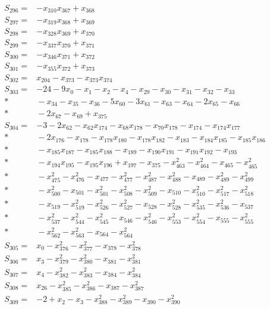 \begin{align*}
S_{296}={}&-x_{310}x_{367}+x_{368}\\[3pt]
S_{297}={}&-x_{319}x_{368}+x_{369}\\[3pt]
S_{298}={}&-x_{328}x_{369}+x_{370}\\[3pt]
S_{299}={}&-x_{337}x_{370}+x_{371}\\[3pt]
S_{300}={}&-x_{346}x_{371}+x_{372}\\[3pt]
S_{301}={}&-x_{355}x_{372}+x_{373}\\[3pt]
S_{302}={}&x_{204}-x_{373}-x_{373}x_{374}\\[3pt]
S_{303}={}&-24-9x_{0}-x_{1}-x_{2}-x_{4}-x_{29}-x_{30}-x_{31}-x_{32}-x_{33}\\*
&{}-x_{34}-x_{35}-x_{36}-5x_{60}-3x_{61}-x_{63}-x_{64}-2x_{65}-x_{66}\\*
&{}-2x_{67}-x_{69}+x_{375}\\[3pt]
S_{304}={}&-3-2x_{62}-x_{62}x_{174}-x_{68}x_{178}-x_{70}x_{178}-x_{174}-x_{174}x_{177}\\*
&{}-2x_{176}-x_{178}-x_{178}x_{180}-x_{178}x_{182}-x_{183}-x_{184}x_{185}-x_{185}x_{186}\\*
&{}-x_{185}x_{187}-x_{185}x_{188}-x_{189}-x_{190}x_{191}-x_{191}x_{192}-x_{193}\\*
&{}-x_{194}x_{195}-x_{195}x_{196}+x_{197}-x_{375}-x_{463}^{2}-x_{464}^{2}-x_{465}-x_{465}^{2}\\*
&{}-x_{475}^{2}-x_{476}^{2}-x_{477}-x_{477}^{2}-x_{487}^{2}-x_{488}^{2}-x_{489}-x_{489}^{2}-x_{499}^{2}\\*
&{}-x_{500}^{2}-x_{501}-x_{501}^{2}-x_{508}^{2}-x_{509}^{2}-x_{510}-x_{510}^{2}-x_{517}^{2}-x_{518}^{2}\\*
&{}-x_{519}-x_{519}^{2}-x_{526}^{2}-x_{527}^{2}-x_{528}-x_{528}^{2}-x_{535}^{2}-x_{536}^{2}-x_{537}\\*
&{}-x_{537}^{2}-x_{544}^{2}-x_{545}^{2}-x_{546}-x_{546}^{2}-x_{553}^{2}-x_{554}^{2}-x_{555}-x_{555}^{2}\\*
&{}-x_{562}^{2}-x_{563}^{2}-x_{564}-x_{564}^{2}\\[3pt]
S_{305}={}&x_{0}-x_{376}^{2}-x_{377}^{2}-x_{378}-x_{378}^{2}\\[3pt]
S_{306}={}&x_{3}-x_{379}^{2}-x_{380}^{2}-x_{381}-x_{381}^{2}\\[3pt]
S_{307}={}&x_{4}-x_{382}^{2}-x_{383}^{2}-x_{384}-x_{384}^{2}\\[3pt]
S_{308}={}&x_{26}-x_{385}^{2}-x_{386}^{2}-x_{387}-x_{387}^{2}\\[3pt]
S_{309}={}&-2+x_{2}-x_{3}-x_{388}^{2}-x_{389}^{2}-x_{390}-x_{390}^{2}\\[3pt]

\end{align*}
